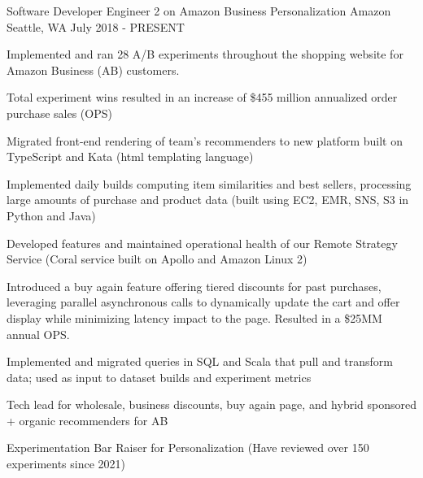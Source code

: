 

\begin{cventries}

  \cventry
    {Software Developer Engineer 2 on Amazon Business Personalization} %
    {Amazon} %
    {Seattle, WA} %
    {July 2018 - PRESENT} %
    {
      \begin{cvitems} %
        \item {Implemented and ran 28 A/B experiments throughout the shopping website for Amazon Business (AB) customers.}
        \item {Total experiment wins resulted in an increase of \$455 million annualized order purchase sales (OPS)}
        \item {Migrated front-end rendering of team's recommenders to new platform built on TypeScript and Kata (html templating language)}
        \item {Implemented daily builds computing item similarities and best sellers, processing large amounts of purchase and product data (built using EC2, EMR, SNS, S3 in Python and Java)}
        \item {Developed features and maintained operational health of our Remote Strategy Service (Coral service built on Apollo and Amazon Linux 2)}
        \item {Introduced a buy again feature offering tiered discounts for past purchases, leveraging parallel asynchronous calls to dynamically update the cart and offer display while minimizing latency impact to the page. Resulted in a \$25MM annual OPS.}
        \item {Implemented and migrated queries in SQL and Scala that pull and transform data; used as input to dataset builds and experiment metrics }
        \item {Tech lead for wholesale, business discounts, buy again page, and hybrid sponsored + organic recommenders for AB}
        \item {Experimentation Bar Raiser for Personalization (Have reviewed over 150 experiments since  2021)}
      \end{cvitems}
    }
    

\end{cventries}
